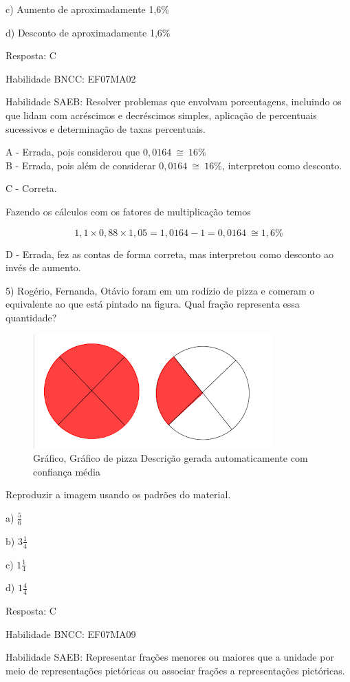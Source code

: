 c) Aumento de aproximadamente 1,6\%

d) Desconto de aproximadamente 1,6\%

Resposta: C

Habilidade BNCC: EF07MA02

Habilidade SAEB: Resolver problemas que envolvam porcentagens, incluindo
os que lidam com acréscimos e decréscimos simples, aplicação de
percentuais sucessivos e determinação de taxas percentuais.

A - Errada, pois considerou que \(0,0164\  \cong \ 16\%\)\\
B - Errada, pois além de considerar \(0,0164\  \cong \ 16\%\),
interpretou como desconto.

C - Correta.

Fazendo os cálculos com os fatores de multiplicação temos

\[1,1 \times 0,88 \times 1,05 = 1,0164 - 1 = 0,0164\  \cong 1,6\%\]

D - Errada, fez as contas de forma correta, mas interpretou como
desconto ao invés de aumento.

5) Rogério, Fernanda, Otávio foram em um rodízio de pizza e comeram o
equivalente ao que está pintado na figura. Qual fração representa essa
quantidade?

\begin{figure}
\centering
\includegraphics[width=3.625in,height=1.72917in]{./imgSAEB_7_MAT/media/image95.png}
\caption{Gráfico, Gráfico de pizza Descrição gerada automaticamente com
confiança média}
\end{figure}

Reproduzir a imagem usando os padrões do material.

a) \(\frac{5}{6}\)

b) \(3\frac{1}{4}\)

c) \(1\frac{1}{4}\)

d) \(1\frac{4}{4}\)

Resposta: C

Habilidade BNCC: EF07MA09

Habilidade SAEB: Representar frações menores ou maiores que a unidade
por meio de representações pictóricas ou associar frações a
representações pictóricas.

